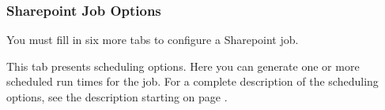%
%

\subsubsection{Sharepoint Job Options}

You must fill in six more tabs to configure a Sharepoint job.


\ifJDBCGuide

\fi

\ifCombinedConnectorGuide
This tab presents scheduling options. Here you can generate one or
more scheduled run times for the job. For a complete description of
the scheduling options, see the description starting on page
\pageref{scheduling}.
\fi


